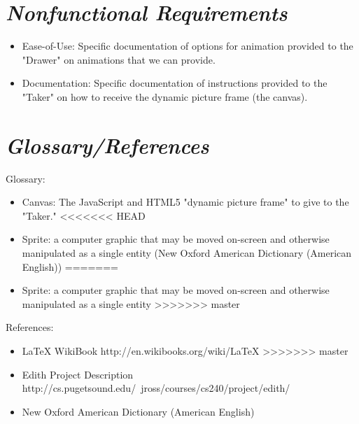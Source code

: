 \documentclass[12pt]{article}
\begin{document}
\section{\emph{Nonfunctional Requirements}}

\begin{itemize}
	\item Ease-of-Use: Specific documentation of options for animation provided to the "Drawer" on animations that we can provide.
	\item Documentation: Specific documentation of instructions provided to the "Taker" on how to receive the dynamic picture frame (the canvas).
\end{itemize}

\section{\emph{Glossary/References}}
Glossary:
\begin{itemize}
	\item Canvas: The JavaScript and HTML5 "dynamic picture frame" to give to the "Taker."
<<<<<<< HEAD
	\item Sprite:  a computer graphic that may be moved on-screen and otherwise manipulated as a single entity (New Oxford American Dictionary (American English))
=======
	\item Sprite:  a computer graphic that may be moved on-screen and otherwise manipulated as a single entity
>>>>>>> master
\end{itemize}

\noindent References: 
\begin{itemize}
<<<<<<< HEAD
=======
	\item LaTeX WikiBook http://en.wikibooks.org/wiki/LaTeX
>>>>>>> master
	\item Edith Project Description http://cs.pugetsound.edu/~jross/courses/cs240/project/edith/
	\item New Oxford American Dictionary (American English)
\end{itemize}
\end{document}
